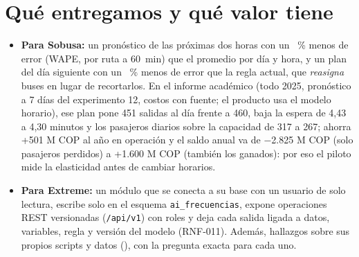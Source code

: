 \documentclass[10pt,a4paper]{article}
\begin{document}
\section{Qué entregamos y qué valor tiene}
\begin{itemize}
\item \textbf{Para Sobusa:} un pronóstico de las próximas dos horas con un \CortoMejoraRel~\% menos de error (WAPE, por
  ruta a 60~min) que el promedio por día y hora, y un plan del día siguiente con un \MejoraRelBuno~\% menos de error
  que la regla actual, que \emph{reasigna} buses en lugar de recortarlos. En el informe académico (todo 2025, pronóstico
  a 7 días del experimento 12, costos con fuente; el producto usa el modelo horario), ese plan pone 451 salidas al
  día frente a 460, baja la espera de 4,43 a 4,30 minutos y los pasajeros diarios sobre la capacidad de 317 a 267;
  ahorra +501 M COP al año en operación y el saldo anual va de −2.825 M COP (solo pasajeros perdidos) a +1.600 M COP
  (también los ganados): por eso el piloto mide la elasticidad antes de cambiar horarios.
\item \textbf{Para Extreme:} un módulo que se conecta a su base con un usuario de solo lectura, escribe solo en el
  esquema \texttt{ai\_frecuencias}, expone \NOperacionesVuno{} operaciones REST versionadas (\texttt{/api/v1}) con roles y deja cada salida
  ligada a datos, variables, regla y versión del modelo (RNF-011). Además, \NHallazgosTexto{} hallazgos sobre sus
  propios scripts y datos (\HallazgosRango), con la pregunta exacta para cada uno.
\end{itemize}
\end{document}
